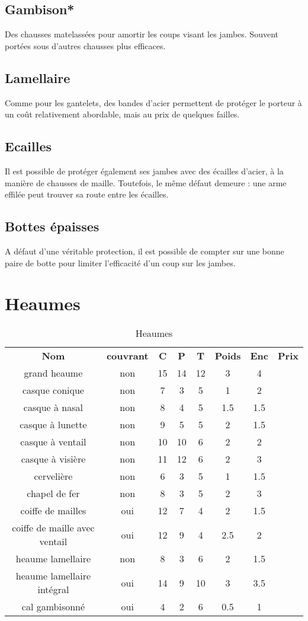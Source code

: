 \documentclass[10pt,a4paper,twocolumn]{book}
\begin{document}
\subsection*{Gambison*}
Des chausses matelassées pour amortir les coups visant les jambes. Souvent portées sous d'autres chausses plus efficaces.
\subsection*{Lamellaire}
Comme pour les gantelets, des bandes d'acier permettent de protéger le porteur à un coût relativement abordable, mais au prix de quelques failles.
\subsection*{Ecailles}
Il est possible de protéger également ses jambes avec des écailles d'acier, à la manière de chausses de maille. Toutefois, le même défaut demeure : une arme effilée peut trouver sa route entre les écailles.
\subsection*{Bottes épaisses}
A défaut d'une véritable protection, il est possible de compter sur une bonne paire de botte pour limiter l'efficacité d'un coup sur les jambes.

\section{Heaumes}
\begin{table*}
\caption{Heaumes}
\label{tableheaumes}
\begin{tabular}{cccccccc}
\textbf{Nom}&\textbf{couvrant}&\textbf{C}&\textbf{P}&\textbf{T}&\textbf{Poids}&\textbf{Enc}&\textbf{Prix}\\
grand heaume & non & 15 & 14 & 12 & 3 & 4 \\
casque conique & non & 7 & 3 & 5 & 1 & 2 \\
casque à nasal & non & 8 & 4 & 5 & 1.5 & 1.5 \\
casque à lunette & non & 9& 5 & 5 & 2 & 1.5 \\
casque à ventail & non & 10 & 10 & 6 & 2 & 2 \\
casque à visière & non & 11 & 12& 6 & 2 & 3 \\
cervelière & non & 6 & 3 & 5 & 1 & 1.5 \\
chapel de fer & non & 8 & 3 & 5 & 2 & 3 \\
coiffe de mailles & oui & 12 & 7& 4 & 2 & 1.5 \\
coiffe de maille avec ventail & oui & 12 & 9& 4 & 2.5 & 2 \\
heaume lamellaire & non & 8 & 3& 6 & 2 &1.5 \\
heaume lamellaire intégral & oui & 14 & 9& 10 & 3 & 3.5 \\
cal gambisonné & oui & 4 & 2& 6 & 0.5 & 1 \\
\end{tabular}
\end{table*}
\end{document}
